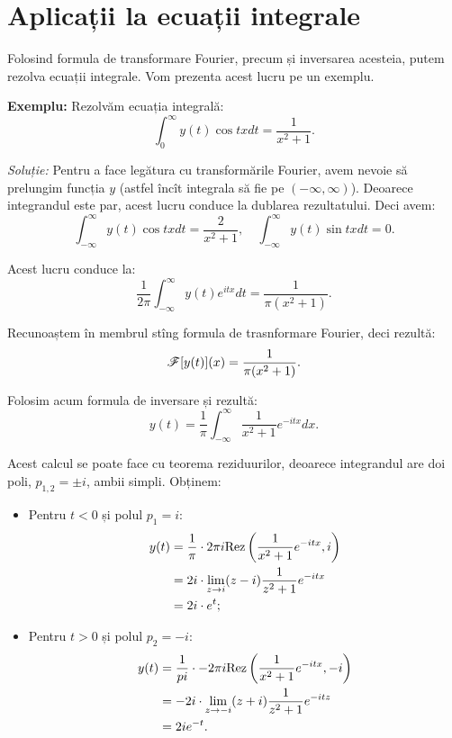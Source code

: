 \section{Aplicații la ecuații integrale}

Folosind formula de transformare Fourier, precum și inversarea acesteia,
putem rezolva ecuații integrale. Vom prezenta acest lucru pe un exemplu.

\textbf{Exemplu:} Rezolvăm ecuația integrală:
\[
  \int_0^\infty y(t) \cos tx dt = \dfrac{1}{x^2 + 1}.
\]

\emph{Soluție:} Pentru a face legătura cu transformările Fourier,
avem nevoie să prelungim funcția $ y $ (astfel încît integrala
să fie pe $ (-\infty, \infty) $). Deoarece integrandul este par,
acest lucru conduce la dublarea rezultatului. Deci avem:
\[
  \int_{-\infty}^\infty y(t) \cos tx dt = \dfrac{2}{x^2 + 1}, \quad %
  \int_{-\infty}^\infty y(t) \sin tx dt = 0.
\]

Acest lucru conduce la:
\[
  \dfrac{1}{ 2\pi} \int_{-\infty}^\infty y(t) e^{itx} dt = \dfrac{1}{\pi(x^2 + 1)}.
\]

Recunoaștem în membrul stîng formula de trasnformare Fourier,
deci rezultă:
\[
  \mathscr{F}[y(t)](x) = \dfrac{1}{\pi(x^2 + 1)}.
\]

Folosim acum formula de inversare și rezultă:
\[
  y(t) = \dfrac{1}{\pi} \int_{-\infty}^\infty \dfrac{1}{x^2 + 1} e^{-itx} dx.
\]

Acest calcul se poate face cu teorema reziduurilor, deoarece integrandul
are doi poli, $ p_{1,2} = \pm i $, ambii simpli. Obținem:
\begin{itemize}
\item Pentru $ t < 0 $ și polul $ p_1 = i $:
  \begin{align*}
    y(t) &= \dfrac{1}{\pi} \cdot 2 \pi i \mathrm{Rez}\left(\dfrac{1}{x^2 + 1} e^{-itx}, i\right) \\
         &= 2 i \cdot \lim_{z \to i} (z - i) \dfrac{1}{z^2 + 1} e^{-itx} \\
         &= 2i \cdot e^t;
  \end{align*}
\item Pentru $ t > 0 $ și polul $ p_2 = -i $:
  \begin{align*}
    y(t) &= \dfrac{1}{pi} \cdot - 2\pi i \mathrm{Rez}\left( \dfrac{1}{x^2 + 1} e^{-itx}, -i\right) \\
         &= -2i \cdot \lim_{z \to -i} (z + i) \dfrac{1}{z^2 + 1} e^{-itz} \\
         &= 2i e^{-t}.
  \end{align*}
\end{itemize}

